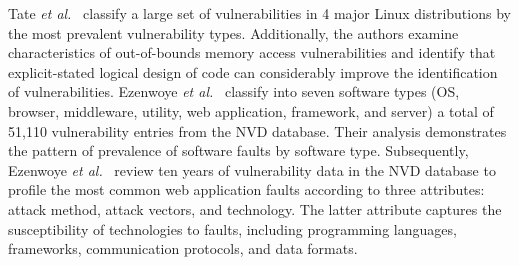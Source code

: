 Tate \textit{et al.}~\cite{Tate2020CharacterizingVI} classify a large set of vulnerabilities in 4 major Linux distributions by the most prevalent vulnerability types. Additionally, the authors examine characteristics of out-of-bounds memory access vulnerabilities and identify that explicit-stated logical design of code can considerably improve the identification of vulnerabilities. Ezenwoye \textit{et al.}~\cite{Ezenwoye2020ClassifyingCS} classify into seven software types (OS, browser, middleware, utility, web application, framework, and server) a total of 51,110 vulnerability entries from the NVD database. Their analysis demonstrates the pattern of prevalence of software faults by software type. Subsequently, Ezenwoye \textit{et al.}~\cite{Ezenwoye2022WebAW} review ten years of vulnerability data in the NVD database to profile the most common web application faults according to three attributes: attack method, attack vectors, and technology. The latter attribute captures the susceptibility of technologies to faults, including programming languages, frameworks, communication protocols, and data formats. 

